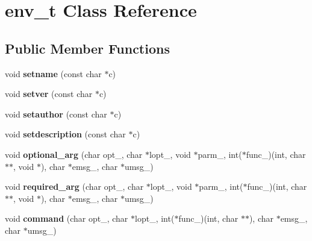 \hypertarget{classenv__t}{\section{env\-\_\-t Class Reference}
\label{classenv__t}
}
\subsection*{Public Member Functions}
\begin{DoxyCompactItemize}
\item 
\hypertarget{classenv__t_a4a79bfddbd1a307bda6be045e3655c14}{void {\bfseries setname} (const char $\ast$c)}\label{classenv__t_a4a79bfddbd1a307bda6be045e3655c14}

\item 
\hypertarget{classenv__t_a938aa066c5816d3fff2c7ff725af7ab4}{void {\bfseries setver} (const char $\ast$c)}\label{classenv__t_a938aa066c5816d3fff2c7ff725af7ab4}

\item 
\hypertarget{classenv__t_a741fe145876764a54ee00be73ffc0b9b}{void {\bfseries setauthor} (const char $\ast$c)}\label{classenv__t_a741fe145876764a54ee00be73ffc0b9b}

\item 
\hypertarget{classenv__t_aa8248adb6bb538f9db08710cadf41c62}{void {\bfseries setdescription} (const char $\ast$c)}\label{classenv__t_aa8248adb6bb538f9db08710cadf41c62}

\item 
\hypertarget{classenv__t_a1a0bc45f5fab86f92ec1d9e64865c144}{void {\bfseries optional\-\_\-arg} (char opt\-\_\-, char $\ast$lopt\-\_\-, void $\ast$parm\-\_\-, int($\ast$func\-\_\-)(int, char $\ast$$\ast$, void $\ast$), char $\ast$emsg\-\_\-, char $\ast$umsg\-\_\-)}\label{classenv__t_a1a0bc45f5fab86f92ec1d9e64865c144}

\item 
\hypertarget{classenv__t_afc6a2cf8967c4396780eccf8e9e3133c}{void {\bfseries required\-\_\-arg} (char opt\-\_\-, char $\ast$lopt\-\_\-, void $\ast$parm\-\_\-, int($\ast$func\-\_\-)(int, char $\ast$$\ast$, void $\ast$), char $\ast$emsg\-\_\-, char $\ast$umsg\-\_\-)}\label{classenv__t_afc6a2cf8967c4396780eccf8e9e3133c}

\item 
\hypertarget{classenv__t_a9f3138b6b234353c3167e00f0d19f48d}{void {\bfseries command} (char opt\-\_\-, char $\ast$lopt\-\_\-, int($\ast$func\-\_\-)(int, char $\ast$$\ast$), char $\ast$emsg\-\_\-, char $\ast$umsg\-\_\-)}\label{classenv__t_a9f3138b6b234353c3167e00f0d19f48d}


\end{DoxyCompactItemize}
